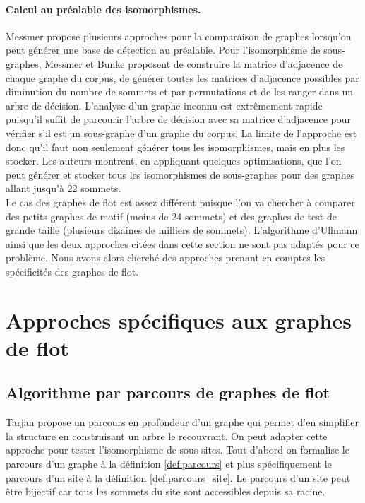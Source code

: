 \paragraph{Calcul au préalable des isomorphismes.}
Messmer \cite{MessPhd} propose plusieurs approches pour la comparaison de graphes lorsqu'on peut générer une base de détection au préalable.
Pour l'isomorphisme de sous-graphes, Messmer et Bunke proposent \cite{MB95} de construire la matrice d'adjacence de chaque graphe du corpus, de générer toutes les matrices d'adjacence possibles par diminution du nombre de sommets et par permutations et de les ranger dans un arbre de décision.
L'analyse d'un graphe inconnu est extrêmement rapide puisqu'il suffit de parcourir l'arbre de décision avec sa matrice d'adjacence pour vérifier s'il est un sous-graphe d'un graphe du corpus.
La limite de l'approche est donc qu'il faut non seulement générer tous les isomorphismes, mais en plus les stocker.
Les auteurs montrent, en appliquant quelques optimisations, que l'on peut générer et stocker tous les isomorphismes de sous-graphes pour des graphes allant jusqu'à 22 sommets.
\\

Le cas des graphes de flot est assez différent puisque l'on va chercher à comparer des petits graphes de motif (moins de 24 sommets) et des graphes de test de grande taille (plusieurs dizaines de milliers de sommets).
L'algorithme d'Ullmann ainsi que les deux approches citées dans cette section ne sont pas adaptés pour ce problème. Nous avons alors cherché des approches prenant en comptes les spécificités des graphes de flot.

\section{Approches spécifiques aux graphes de flot}
\subsection{Algorithme par parcours de graphes de flot}
Tarjan \cite{Tar71} propose un parcours en profondeur d'un graphe qui permet d'en simplifier la structure en construisant un arbre le recouvrant. 
On peut adapter cette approche pour tester l'isomorphisme de sous-sites. 
Tout d'abord on formalise le parcours d'un graphe à la définition \ref{def:parcours} et plus spécifiquement le parcours d'un site à la définition \ref{def:parcours_site}.
Le parcours d'un site peut être bijectif car tous les sommets du site sont accessibles depuis sa racine.

